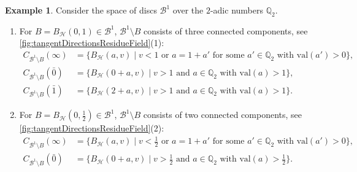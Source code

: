 \documentclass[10pt]{article}
\theoremstyle{definition}
\newtheorem{example}[theorem]{Example}
\newcommand{\QQ}{\mathbb{Q}}
\newcommand{\val}{{\mathrm{val}}}
\begin{document}
\begin{example}
  \label{ex:tangentDirectionResidueField}
  Consider the space of discs $\mathcal B^1$ over the $2$-adic numbers $\QQ_2$.
  \begin{enumerate}
  \item For $B=B_\mathcal{H}(0,1)\in \mathcal B^1$, $\mathcal B^1\setminus B$ consists of three connected components, see \cref{fig:tangentDirectionsResidueField}(1):
    \begin{align*}
      C_{\mathcal B^1\setminus B}(\infty) &= \{ B_\mathcal{H}(a,v) \mid v<1 \text{ or } a = 1+a' \text{ for some } a'\in\QQ_2 \text{ with }\val(a')>0 \}, \\
      C_{\mathcal B^1\setminus B}(\bar 0) &= \{ B_\mathcal{H}(0+a,v) \mid v>1 \text{ and } a\in \QQ_2 \text{ with } \val(a)>1 \}, \\
      C_{\mathcal B^1\setminus B}(\bar 1) &= \{ B_\mathcal{H}(2+a,v) \mid v>1 \text{ and } a\in \QQ_2 \text{ with } \val(a)>1 \}.
    \end{align*}
  \item For $B=B_\mathcal{H}(0,\frac12)\in \mathcal B^1$, $\mathcal B^1\setminus B$ consists of two connected components, see \cref{fig:tangentDirectionsResidueField}(2):
    \begin{align*}
      C_{\mathcal B^1\setminus B}(\infty) &= \{ B_\mathcal{H}(a,v) \mid v<\textstyle\frac 12 \text{ or } a = 1+a' \text{ for some } a'\in\QQ_2 \text{ with }\val(a')>0 \}, \\
      C_{\mathcal B^1\setminus B}(\bar 0) &= \{ B_\mathcal{H}(0+a,v) \mid v>\textstyle\frac 12 \text{ and } a\in \QQ_2 \text{ with } \val(a)>\frac 12 \}.
    \end{align*}
  \end{enumerate}
\end{example}
\end{document}
